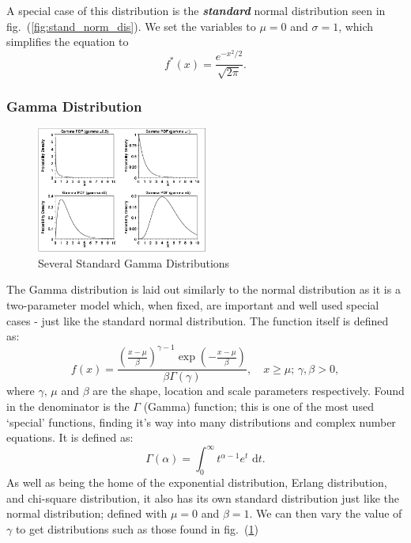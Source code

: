 \documentclass{article}
\begin{document}
A special case of this distribution is the \textbf{\textit{standard}} normal distribution seen in fig.~(\ref{fig:stand_norm_dis}). We set the variables to $\mu=0$ and $\sigma=1$, which simplifies the equation to
\begin{equation}
    f^*(x) = \frac{e^{-x^2/2}}{\sqrt{2\pi}}.
\end{equation}

\subsubsection{Gamma Distribution}
\begin{figure}[H]
\centering
\includegraphics[width=0.5\textwidth]{images/gampdf4.png}
\caption{Several Standard Gamma Distributions} \label{fig:stand_gam_dis}
\end{figure}
The Gamma distribution is laid out similarly to the normal distribution as it is a two-parameter model which, when fixed, are important and well used special cases - just like the standard normal distribution. The function itself is defined as:
\begin{equation}
    f(x) = \frac{\left( \frac{x-\mu}{\beta} \right)^{\gamma -1}\exp{\left( -\frac{x-\mu}{\beta} \right)}}{\beta\Gamma(\gamma)},\quad x\geq\mu;\, \gamma,\beta>0,
\end{equation}
where $\gamma,\,\mu$ and $\beta$ are the shape, location and scale parameters respectively. Found in the denominator is the $\Gamma$ (Gamma) function; this is one of the most used `special' functions, finding it's way into many distributions and complex number equations. It is defined as:
\begin{equation}
    \Gamma(\alpha) = \int_0^\infty t^{\alpha-1}e^t\text{ d}t.
\end{equation}
As well as being the home of the exponential distribution, Erlang distribution, and chi-square distribution, it also has its own standard distribution just like the normal distribution; defined with $\mu=0$ and $\beta=1$. We can then vary the value of $\gamma$ to get distributions such as those found in fig.~(\ref{fig:stand_gam_dis})
\end{document}
